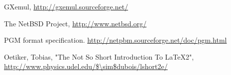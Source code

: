 \documentclass[a4paper,10pt]{article}
\begin{document}
\pagebreak

\begin{thebibliography}{99}

 GXemul, \url{http://gxemul.sourceforge.net/}

 The NetBSD Project, \url{http://www.netbsd.org/}

 PGM format specification.
\url{http://netpbm.sourceforge.net/doc/pgm.html}

 Oetiker, Tobias, "The Not So Short Introduction To LaTeX2", \url{http://www.physics.udel.edu/$\sim$dubois/lshort2e/}

\end{thebibliography}
\end{document}

